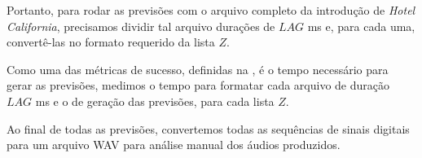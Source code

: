 Portanto, para rodar as previsões com o arquivo completo da introdução de \textit{Hotel California}, precisamos dividir tal arquivo durações de $LAG$ ms e, para cada uma, convertê-las no formato requerido da lista $Z$.

Como uma das métricas de sucesso, definidas na , é o tempo necessário para gerar as previsões, medimos o tempo para formatar cada arquivo de duração $LAG$ ms e o de geração das previsões, para cada lista $Z$.

Ao final de todas as previsões, convertemos todas as sequências de sinais digitais para um arquivo WAV para análise manual dos áudios produzidos.